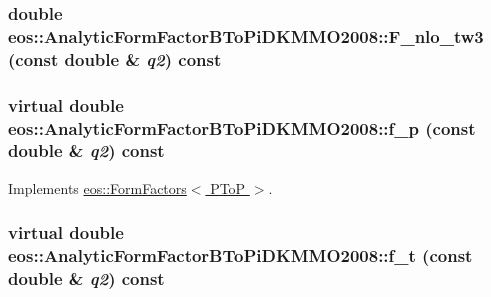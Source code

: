 \label{classeos_1_1AnalyticFormFactorBToPiDKMMO2008_abb2691fe8415e5c5c4db53af3ef4ba41}
\hypertarget{classeos_1_1AnalyticFormFactorBToPiDKMMO2008_a8d4a9d28a81a8b60d557162f0e3a0c5a}{
\subsubsection[{F\_\-nlo\_\-tw3}]{\setlength{\rightskip}{0pt plus 5cm}double eos::AnalyticFormFactorBToPiDKMMO2008::F\_\-nlo\_\-tw3 (const double \& {\em q2}) const}}
\label{classeos_1_1AnalyticFormFactorBToPiDKMMO2008_a8d4a9d28a81a8b60d557162f0e3a0c5a}
\hypertarget{classeos_1_1AnalyticFormFactorBToPiDKMMO2008_acc3cbe21d5bab4ee23a457b757749bbf}{
\subsubsection[{f\_\-p}]{\setlength{\rightskip}{0pt plus 5cm}virtual double eos::AnalyticFormFactorBToPiDKMMO2008::f\_\-p (const double \& {\em q2}) const}}
\label{classeos_1_1AnalyticFormFactorBToPiDKMMO2008_acc3cbe21d5bab4ee23a457b757749bbf}


Implements \hyperlink{classeos_1_1FormFactors_3_01PToP_01_4_a987757eb4559de496005ed2730e78a10}{eos::FormFactors$<$ PToP $>$}.\hypertarget{classeos_1_1AnalyticFormFactorBToPiDKMMO2008_aa3903289904f6e732bc9094f3826d3be}{
\subsubsection[{f\_\-t}]{\setlength{\rightskip}{0pt plus 5cm}virtual double eos::AnalyticFormFactorBToPiDKMMO2008::f\_\-t (const double \& {\em q2}) const}}
\label{classeos_1_1AnalyticFormFactorBToPiDKMMO2008_aa3903289904f6e732bc9094f3826d3be}


